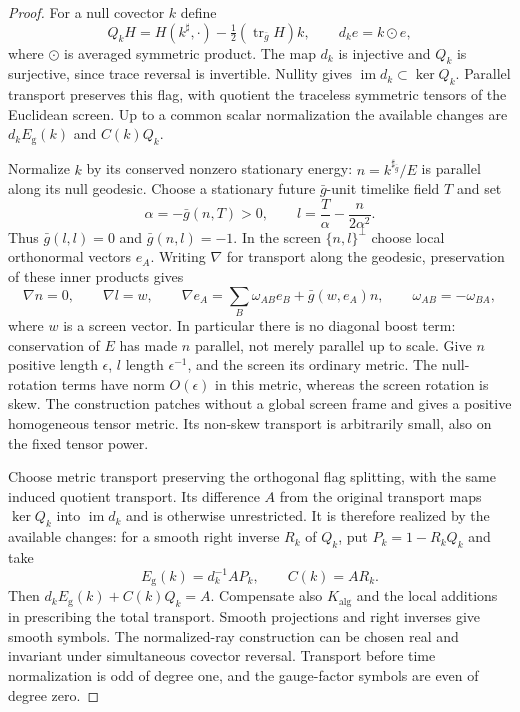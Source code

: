 \begin{proof}
For a null covector $k$ define
\[
 Q_kH=H(k^\sharp,\cdot)
                  -\tfrac12(\operatorname{tr}_{\bar g}H)k,
 \qquad d_ke=k\odot e,
\]
where $\odot$ is averaged symmetric product.  The map $d_k$ is
injective and $Q_k$ is surjective, since trace reversal is invertible.
Nullity gives $\operatorname{im}d_k\subset\ker Q_k$.
Parallel transport preserves this flag, with quotient the traceless
symmetric tensors of the Euclidean screen.  Up to a common scalar
normalization the available changes are $d_kE_{\mathrm g}(k)$
and $C(k)Q_k$.

Normalize $k$ by its conserved nonzero stationary energy:
$n=k^{\sharp_{\bar g}}/E$ is parallel along its null geodesic.
Choose a stationary future $\bar g$-unit timelike field $T$ and set
\[
 \alpha=-\bar g(n,T)>0,\qquad
 l=\frac{T}{\alpha}-\frac{n}{2\alpha^2}.
\]
Thus $\bar g(l,l)=0$ and $\bar g(n,l)=-1$.  In the screen
$\{n,l\}^{\perp}$ choose local orthonormal vectors $e_A$.
Writing $\nabla$ for transport along the geodesic, preservation
of these inner products gives
\[
 \nabla n=0,\qquad \nabla l=w,\qquad
 \nabla e_A=\sum_B\omega_{AB}e_B+\bar g(w,e_A)n,
 \qquad \omega_{AB}=-\omega_{BA},
\]
where $w$ is a screen vector.  In particular there is no diagonal
boost term: conservation of $E$ has made $n$ parallel, not merely
parallel up to scale.  Give $n$ positive length $\epsilon$, $l$
length $\epsilon^{-1}$, and the screen its ordinary metric.
The null-rotation terms have norm $O(\epsilon)$ in this metric,
whereas the screen rotation is skew.  The construction patches
without a global screen frame and gives a positive homogeneous
tensor metric.  Its non-skew transport is arbitrarily small,
also on the fixed tensor power.

Choose metric transport preserving the orthogonal flag splitting,
with the same induced quotient transport.  Its difference $A$
from the original transport maps $\ker Q_k$ into
$\operatorname{im}d_k$ and is otherwise unrestricted.  It is
therefore realized by the available changes: for a smooth right
inverse $R_k$ of $Q_k$, put $P_k=1-R_kQ_k$ and take
\[
 E_{\mathrm g}(k)=d_k^{-1}AP_k,\qquad C(k)=AR_k.
\]
Then $d_kE_{\mathrm g}(k)+C(k)Q_k=A$.  Compensate also
$K_{\mathrm{alg}}$ and the local additions in prescribing the
total transport.  Smooth projections and right inverses give
smooth symbols.  The normalized-ray construction can be chosen
real and invariant under simultaneous covector reversal.
Transport before time normalization is odd of degree one,
and the gauge-factor symbols are even of degree zero.


\end{proof}
